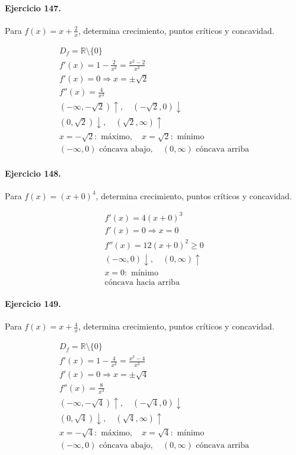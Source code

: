 \documentclass[11pt,a4paper]{article}
\begin{document}
\paragraph{Ejercicio 147.} Para $f(x)=x+\frac{2}{x}$, determina crecimiento, puntos críticos y concavidad.

\[
\begin{aligned}
D_f=\mathbb{R}\setminus\{0\}\\
f'(x)=1-\frac{2}{x^2}=\frac{x^2-2}{x^2}\\
f'(x)=0\Rightarrow x=\pm \sqrt{2}\\
f''(x)=\frac{4}{x^3}\\
(-\infty,-\sqrt{2})\uparrow,\quad(-\sqrt{2},0)\downarrow\\
(0,\sqrt{2})\downarrow,\quad(\sqrt{2},\infty)\uparrow\\
x=-\sqrt{2}:\text{ máximo},\quad x=\sqrt{2}:\text{ mínimo}\\
(-\infty,0)\text{{ cóncava abajo}},\quad(0,\infty)\text{{ cóncava arriba}}
\end{aligned}
\]


\paragraph{Ejercicio 148.} Para $f(x)=(x+0)^4$, determina crecimiento, puntos críticos y concavidad.

\[
\begin{aligned}
f'(x)=4(x+0)^3\\
f'(x)=0\Rightarrow x=0\\
f''(x)=12(x+0)^2\ge0\\
(-\infty,0)\downarrow,\quad(0,\infty)\uparrow\\
x=0:\text{ mínimo}\\
\text{{cóncava hacia arriba}}
\end{aligned}
\]


\paragraph{Ejercicio 149.} Para $f(x)=x+\frac{4}{x}$, determina crecimiento, puntos críticos y concavidad.

\[
\begin{aligned}
D_f=\mathbb{R}\setminus\{0\}\\
f'(x)=1-\frac{4}{x^2}=\frac{x^2-4}{x^2}\\
f'(x)=0\Rightarrow x=\pm \sqrt{4}\\
f''(x)=\frac{8}{x^3}\\
(-\infty,-\sqrt{4})\uparrow,\quad(-\sqrt{4},0)\downarrow\\
(0,\sqrt{4})\downarrow,\quad(\sqrt{4},\infty)\uparrow\\
x=-\sqrt{4}:\text{ máximo},\quad x=\sqrt{4}:\text{ mínimo}\\
(-\infty,0)\text{{ cóncava abajo}},\quad(0,\infty)\text{{ cóncava arriba}}
\end{aligned}
\]
\end{document}
